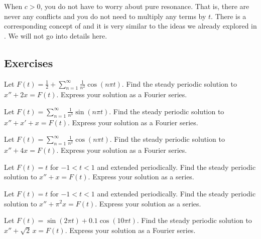 When $c > 0$, you do not have to worry about pure resonance.  That is,
there are never any conflicts and you do not need to multiply any
terms by $t$.  There is a corresponding concept of
and it is very similar to the ideas we already explored in
.  We will not go into details here.

\subsection{Exercises}

\begin{exercise}
Let $F(t) = \frac{1}{2} + \sum_{n=1}^\infty \frac{1}{n^2} \cos (n \pi t)$.
Find
the steady periodic solution to
$x'' + 2 x = F(t)$.  Express your solution as a Fourier series.
\end{exercise}

\begin{exercise}
Let $F(t) = \sum_{n=1}^\infty \frac{1}{n^3} \sin (n \pi t)$.  Find
the steady periodic solution to
$x'' + x' + x = F(t)$.  Express your solution as a Fourier series.
\end{exercise}

\begin{exercise}
Let $F(t) = \sum_{n=1}^\infty \frac{1}{n^2} \cos (n \pi t)$.  Find
the steady periodic solution to
$x'' + 4 x = F(t)$.  Express your solution as a Fourier series.
\end{exercise}

\begin{exercise}
Let $F(t) = t$ for $-1 < t < 1$ and extended periodically.
Find the steady periodic solution to
$x'' + x = F(t)$.  Express your solution as a series.
\end{exercise}

\begin{exercise}
Let $F(t) = t$ for $-1 < t < 1$ and extended periodically.
Find the steady periodic solution to
$x'' + \pi^2 x = F(t)$.  Express your solution as a series.
\end{exercise}

\setcounter{exercise}{100}

\begin{exercise}
Let $F(t) = \sin(2\pi t) + 0.1 \cos(10 \pi t)$.
Find the steady periodic solution to $x'' + \sqrt{2}\, x = F(t)$.
Express your solution as a Fourier series.
\end{exercise}

